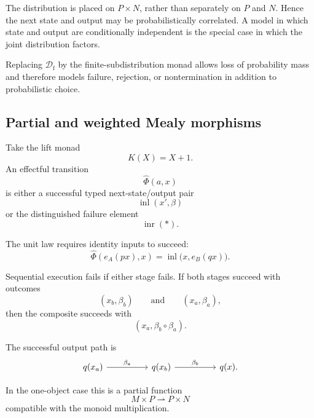 The distribution is placed on \(P\times N\), rather than separately on \(P\)
and \(N\). Hence the next state and output may be probabilistically correlated.
A model in which state and output are conditionally independent is the special
case in which the joint distribution factors.

Replacing \(\mathcal D_{\mathrm f}\) by the finite-subdistribution monad
allows loss of probability mass and therefore models failure, rejection, or
nontermination in addition to probabilistic choice.

\subsection{Partial and weighted Mealy morphisms}
\label{subsec:partial-weighted-mealy-morphisms}

\begin{example}
\label{example:partial-mealy-morphisms}
    Take the lift monad
    \[
        K(X)=X+1.
    \]
    An effectful transition
    \[
        \widehat\Phi(a,x)
    \]
    is either a successful typed next-state/output pair
    \[
        \operatorname{inl}(x',\beta)
    \]
    or the distinguished failure element
    \[
        \operatorname{inr}(\ast).
    \]

    The unit law requires identity inputs to succeed:
    \[
        \widehat\Phi(e_A(px),x)
        =
        \operatorname{inl}
        \bigl(x,e_B(qx)\bigr).
    \]

    Sequential execution fails if either stage fails. If both stages succeed
    with outcomes
    \[
        (x_b,\beta_b)
        \qquad\text{and}\qquad
        (x_a,\beta_a),
    \]
    then the composite succeeds with
    \[
        (x_a,\beta_b\circ\beta_a).
    \]

    The successful output path is
    \[
        \begin{tikzcd}[column sep=huge]
                q(x_a)
                    \arrow[r, "\beta_a"]
            &
                q(x_b)
                    \arrow[r, "\beta_b"]
            &
                q(x).
        \end{tikzcd}
    \]

    In the one-object case this is a partial function
    \[
        M\times P
        \rightharpoonup
        P\times N
    \]
    compatible with the monoid multiplication.
\end{example}

